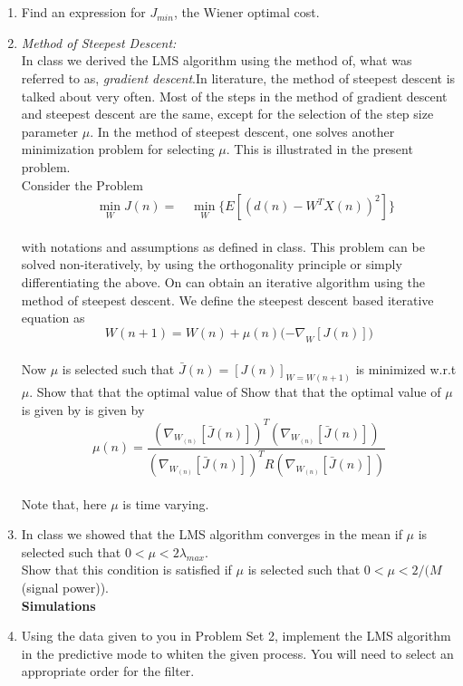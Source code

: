 \documentclass[journal,12pt,twocolumn]{IEEEtran}
\begin{document}
\section{}
\begin{enumerate}
\item Find an expression for $J_{min}$, the Wiener optimal cost.\\
\medskip
\item \textit{Method of Steepest Descent:}\\
\smallskip
In class we derived the LMS algorithm using the method of, what was referred to as, \textit{gradient descent}.In literature, the method of steepest descent is talked about very often. Most of the steps in the method of gradient descent and steepest descent are the same, except for the selection of the step size parameter $\mu $. In the method of steepest descent, one solves another minimization problem for selecting $ \mu.$ This is illustrated in the present problem.\\
\smallskip
Consider the Problem\\
$$\quad\min_W{J(n)}=\quad\min_W\{E[(d(n)-W^TX(n))^2]\}$$\\
\medskip
with notations and assumptions as defined in class. This problem can be solved non-iteratively, by using the orthogonality principle or simply differentiating the above. On can obtain an iterative algorithm using the method of steepest descent. We define the steepest descent based iterative equation as\\
$$W(n+1)=W(n)+\mu(n){(-\nabla}_W[J(n)])$$\\
\medskip
Now $\mu$ is selected such that $\bar{J}(n)=[J(n)]_{W=W(n+1 )}$ is minimized w.r.t $\mu.$ Show that that the optimal value of Show that that the optimal value of $\mu$ is given by is given by
$$\mu(n)=\frac{(\nabla_{W_{(n)}}[\bar{J}(n)])^T(\nabla_{W_{(n)}}[\bar{J}(n)])}{(\nabla_{W_{(n)}}[\bar{J}(n)])^TR(\nabla_{W_{(n)}}[\bar{J}{(n)}])} $$\\
\medskip
Note that, here $\mu $ is time varying.
\medskip
\item In class we showed that the LMS algorithm converges in the mean if $\mu $ is selected such that $0<\mu <2{\lambda}_{max}.$ \\
Show that this condition is satisfied if $\mu$ is selected such that $0 < \mu < 2/(M$ (signal power)).\\
\bigskip 	
\textbf{Simulations}
\medskip
\item Using the data given to you in Problem Set 2, implement the LMS algorithm in the predictive mode to whiten the given process. You will need to select an appropriate order for the filter.\\

\end{enumerate}
\end{document}
